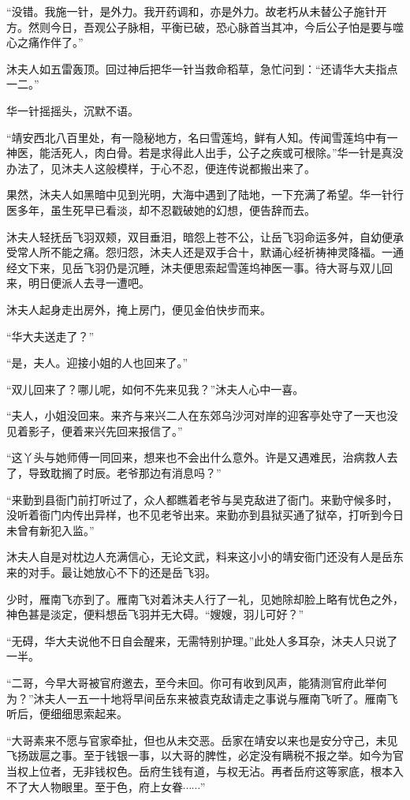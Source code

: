 “没错。我施一针，是外力。我开药调和，亦是外力。故老朽从未替公子施针开方。然则今日，吾观公子脉相，平衡已破，恐心脉首当其冲，今后公子怕是要与噬心之痛作伴了。”

沐夫人如五雷轰顶。回过神后把华一针当救命稻草，急忙问到：“还请华大夫指点一二。”

华一针摇摇头，沉默不语。

“靖安西北八百里处，有一隐秘地方，名曰雪莲坞，鲜有人知。传闻雪莲坞中有一神医，能活死人，肉白骨。若是求得此人出手，公子之疾或可根除。”华一针是真没办法了，见沐夫人这般模样，于心不忍，便连传说都搬出来了。

果然，沐夫人如黑暗中见到光明，大海中遇到了陆地，一下充满了希望。华一针行医多年，虽生死早已看淡，却不忍戳破她的幻想，便告辞而去。

沐夫人轻抚岳飞羽双颊，双目垂泪，暗怨上苍不公，让岳飞羽命运多舛，自幼便承受常人所不能之痛。怨归怨，沐夫人还是双手合十，默诵心经祈祷神灵降福。一通经文下来，见岳飞羽仍是沉睡，沐夫便思索起雪莲坞神医一事。待大哥与双儿回来，明日便派人去寻一遭吧。

沐夫人起身走出房外，掩上房门，便见金伯快步而来。

“华大夫送走了？”

“是，夫人。迎接小姐的人也回来了。”

“双儿回来了？哪儿呢，如何不先来见我？”沐夫人心中一喜。

“夫人，小姐没回来。来齐与来兴二人在东郊乌沙河对岸的迎客亭处守了一天也没见着影子，便着来兴先回来报信了。”

“这丫头与她师傅一同回来，想来也不会出什么意外。许是又遇难民，治病救人去了，导致耽搁了时辰。老爷那边有消息吗？”

“来勤到县衙门前打听过了，众人都瞧着老爷与吴克敌进了衙门。来勤守候多时，没听着衙门内传出异样，也不见老爷出来。来勤亦到县狱买通了狱卒，打听到今日未曾有新犯入监。”

沐夫人自是对枕边人充满信心，无论文武，料来这小小的靖安衙门还没有人是岳东来的对手。最让她放心不下的还是岳飞羽。

少时，雁南飞亦到了。雁南飞对着沐夫人行了一礼，见她除却脸上略有忧色之外，神色甚是淡定，便料想岳飞羽并无大碍。“嫂嫂，羽儿可好？”

“无碍，华大夫说他不日自会醒来，无需特别护理。”此处人多耳杂，沐夫人只说了一半。

“二哥，今早大哥被官府邀去，至今未回。你可有收到风声，能猜测官府此举何为？”沐夫人一五一十地将早间岳东来被袁克敌请走之事说与雁南飞听了。雁南飞听后，便细细思索起来。

“大哥素来不愿与官家牵扯，但也从未交恶。岳家在靖安以来也是安分守己，未见飞扬跋扈之事。至于钱银一事，以大哥的脾性，必定没有瞒税不报之举。如今为官当权上位者，无非钱权色。岳府生钱有道，与权无沾。再者岳府这等家底，根本入不了大人物眼里。至于色，府上女眷$\cdots\cdots$”

